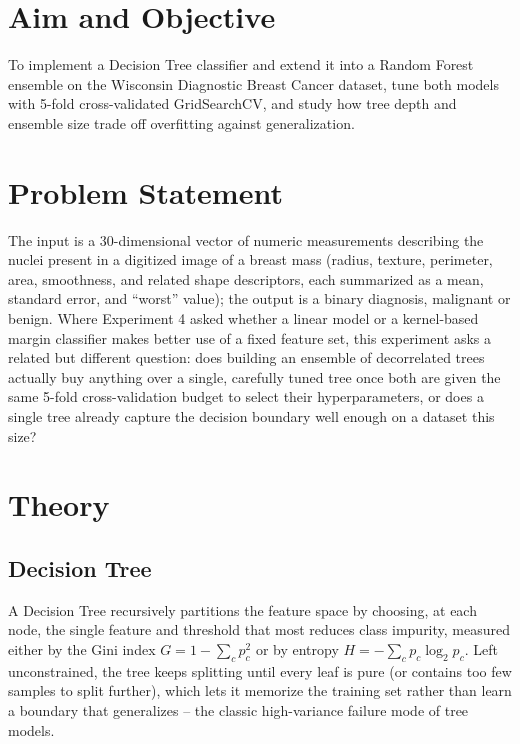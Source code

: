 \documentclass[11pt,a4paper]{article}
\begin{document}
\section{Aim and Objective}
To implement a Decision Tree classifier and extend it into a Random Forest ensemble on the Wisconsin Diagnostic Breast Cancer dataset, tune both models with 5-fold cross-validated GridSearchCV, and study how tree depth and ensemble size trade off overfitting against generalization.

\section{Problem Statement}
The input is a 30-dimensional vector of numeric measurements describing the nuclei present in a digitized image of a breast mass (radius, texture, perimeter, area, smoothness, and related shape descriptors, each summarized as a mean, standard error, and ``worst'' value); the output is a binary diagnosis, malignant or benign. Where Experiment 4 asked whether a linear model or a kernel-based margin classifier makes better use of a fixed feature set, this experiment asks a related but different question: does building an ensemble of decorrelated trees actually buy anything over a single, carefully tuned tree once both are given the same 5-fold cross-validation budget to select their hyperparameters, or does a single tree already capture the decision boundary well enough on a dataset this size?

\section{Theory}

\subsection{Decision Tree}
A Decision Tree recursively partitions the feature space by choosing, at each node, the single feature and threshold that most reduces class impurity, measured either by the Gini index $G = 1-\sum_c p_c^2$ or by entropy $H = -\sum_c p_c\log_2 p_c$. Left unconstrained, the tree keeps splitting until every leaf is pure (or contains too few samples to split further), which lets it memorize the training set rather than learn a boundary that generalizes -- the classic high-variance failure mode of tree models.
\end{document}
